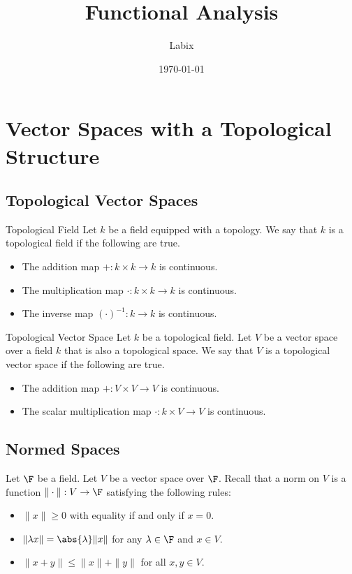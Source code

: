 \documentclass[a4paper]{article}
\title{Functional Analysis}
\author{Labix}
\date{\today}
\begin{document}
\maketitle
\begin{abstract}
\end{abstract}
\tableofcontents
\pagebreak

\section{Vector Spaces with a Topological Structure}
\subsection{Topological Vector Spaces}
\begin{defn}{Topological Field}{} Let $k$ be a field equipped with a topology. We say that $k$ is a topological field if the following are true. 
\begin{itemize}
\item The addition map $+:k\times k\to k$ is continuous. 
\item The multiplication map $\cdot:k\times k\to k$ is continuous. 
\item The inverse map $(\cdot)^{-1}:k\to k$ is continuous. 
\end{itemize}
\end{defn}

\begin{defn}{Topological Vector Space}{} Let $k$ be a topological field. Let $V$ be a vector space over a field $k$ that is also a topological space. We say that $V$ is a topological vector space if the following are true. 
\begin{itemize}
\item The addition map $+:V\times V\to V$ is continuous. 
\item The scalar multiplication map $\cdot:k\times V\to V$ is continuous. 
\end{itemize}
\end{defn}

\subsection{Normed Spaces}
Let $\F$ be a field. Let $V$ be a vector space over $\F$. Recall that a norm on $V$ is a function $\|\cdot\|:V\to\F$ satisfying the following rules: 
\begin{itemize}
\item $\|x\|\geq 0$ with equality if and only if $x=0$. 
\item $\|\lambda x\|=\abs{\lambda}\|x\|$ for any $\lambda\in\F$ and $x\in V$. 
\item $\|x+y\|\leq\|x\|+\|y\|$ for all $x,y\in V$. 
\end{itemize}
\end{document}
